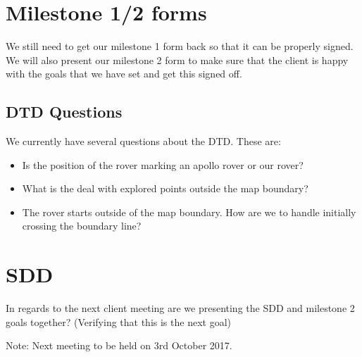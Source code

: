 \documentclass[11pt, a4paper]{article}
\begin{document}
  \section{ Milestone 1/2 forms }
  We still need to get our milestone 1 form back so that it can be properly signed.
  \\We will also present our milestone 2 form to make sure that the client is happy with the goals that we have set and get this signed off.

  \subsection{ DTD Questions }
  We currently have several questions about the DTD. These are:
  \begin{itemize}
  	\item{Is the position of the rover marking an apollo rover or our rover?}
  	\item{What is the deal with explored points outside the map boundary?}
  	\item{The rover starts outside of the map boundary. How are we to handle initially crossing the boundary line?}
  \end{itemize}

  \section{ SDD }
  In regards to the next client meeting are we presenting the SDD and milestone 2 goals together? (Verifying that this is the next goal)

  \vspace*{10pt}
  \noindent Note: Next meeting to be held on 3rd October 2017.


  
\end{document}
